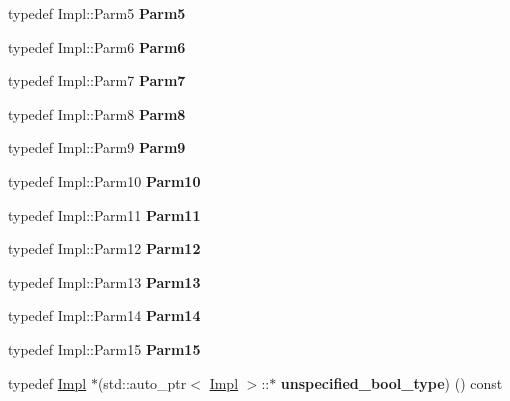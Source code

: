 \begin{DoxyCompactItemize}
\item 
\hypertarget{classLoki_1_1Functor_aea364a78c56dcebeb9ec7409de5e0da1}{}typedef Impl\+::\+Parm5 {\bfseries Parm5}\label{classLoki_1_1Functor_aea364a78c56dcebeb9ec7409de5e0da1}

\item 
\hypertarget{classLoki_1_1Functor_ab06e3bdf61397fd84e984e5168722ff9}{}typedef Impl\+::\+Parm6 {\bfseries Parm6}\label{classLoki_1_1Functor_ab06e3bdf61397fd84e984e5168722ff9}

\item 
\hypertarget{classLoki_1_1Functor_aab5ee7fd35cf323f8dca110e93eb80ba}{}typedef Impl\+::\+Parm7 {\bfseries Parm7}\label{classLoki_1_1Functor_aab5ee7fd35cf323f8dca110e93eb80ba}

\item 
\hypertarget{classLoki_1_1Functor_a2d997a91357dfb969aed7024872ed742}{}typedef Impl\+::\+Parm8 {\bfseries Parm8}\label{classLoki_1_1Functor_a2d997a91357dfb969aed7024872ed742}

\item 
\hypertarget{classLoki_1_1Functor_aeaf24b289db13359375b65618594864f}{}typedef Impl\+::\+Parm9 {\bfseries Parm9}\label{classLoki_1_1Functor_aeaf24b289db13359375b65618594864f}

\item 
\hypertarget{classLoki_1_1Functor_a3737d6d33f30f93b495b736eddd6dfbc}{}typedef Impl\+::\+Parm10 {\bfseries Parm10}\label{classLoki_1_1Functor_a3737d6d33f30f93b495b736eddd6dfbc}

\item 
\hypertarget{classLoki_1_1Functor_ad2a56df2277423342e6ad32b7b8ee5eb}{}typedef Impl\+::\+Parm11 {\bfseries Parm11}\label{classLoki_1_1Functor_ad2a56df2277423342e6ad32b7b8ee5eb}

\item 
\hypertarget{classLoki_1_1Functor_addaff575d8563e7e95b019eae9966d70}{}typedef Impl\+::\+Parm12 {\bfseries Parm12}\label{classLoki_1_1Functor_addaff575d8563e7e95b019eae9966d70}

\item 
\hypertarget{classLoki_1_1Functor_ab1314bcd2d2598990f77f559cf2e3aa4}{}typedef Impl\+::\+Parm13 {\bfseries Parm13}\label{classLoki_1_1Functor_ab1314bcd2d2598990f77f559cf2e3aa4}

\item 
\hypertarget{classLoki_1_1Functor_afaaa55a230bf521b9bd5c4ecb9385889}{}typedef Impl\+::\+Parm14 {\bfseries Parm14}\label{classLoki_1_1Functor_afaaa55a230bf521b9bd5c4ecb9385889}

\item 
\hypertarget{classLoki_1_1Functor_a1efbf17924c5e0283e12c730f2bae945}{}typedef Impl\+::\+Parm15 {\bfseries Parm15}\label{classLoki_1_1Functor_a1efbf17924c5e0283e12c730f2bae945}

\item 
\hypertarget{classLoki_1_1Functor_aa05f589f089f1c3d4cb85abaf5f2bb5e}{}typedef \hyperlink{classLoki_1_1FunctorImpl}{Impl} $\ast$(std\+::auto\+\_\+ptr$<$ \hyperlink{classLoki_1_1FunctorImpl}{Impl} $>$\+::$\ast$ {\bfseries unspecified\+\_\+bool\+\_\+type}) () const \label{classLoki_1_1Functor_aa05f589f089f1c3d4cb85abaf5f2bb5e}

\end{DoxyCompactItemize}
